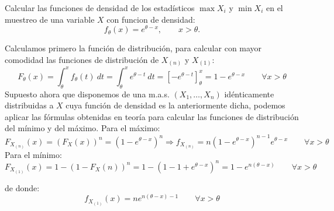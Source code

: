 \begin{ejercicio}
    Calcular las funciones de densidad de los estadísticos $\max X_i$ y $\min X_i$ en el muestreo de una variable $X$ con funcion de densidad:
    \begin{equation*}
        f_\theta(x) = e^{\theta-x}, \qquad x>\theta.
    \end{equation*}

    \noindent
    Calculamos primero la función de distribución, para calcular con mayor comodidad las funciones de distribución de $X_{(n)}$ y $X_{(1)}$:
    \begin{equation*}
        F_\theta(x) = \int_{\theta}^{x} f_\theta(t)~dt = \int_{\theta}^{x} e^{\theta-t}~dt  = \left[-e^{\theta-t}\right]_\theta^x = 1 - e^{\theta - x} \qquad \forall x>\theta
    \end{equation*}
    Supuesto ahora que disponemos de una m.a.s. $(X_1, \ldots, X_n)$ idénticamente distribuidas a $X$ cuya función de densidad es la anteriormente dicha, podemos aplicar las fórmulas obtenidas en teoría para calcular las funciones de distribución del mínimo y del máximo. Para el máximo:
    \begin{equation*}
        F_{X_{(n)}}(x) = {(F_X(x))}^{n} = {(1-e^{\theta-x})}^{n} \Longrightarrow f_{X_{(n)}} = n{(1-e^{\theta - x})}^{n-1}e^{\theta -x} \qquad \forall x>\theta
    \end{equation*}
    Para el mínimo:
    \begin{equation*}
        F_{X_{(1)}}(x) = 1 - {(1-F_X(n))}^{n} = 1-{(1-1+e^{\theta-x})}^{n} = 1-e^{n(\theta-x)} \qquad \forall x>\theta
    \end{equation*}

    de donde:
    \begin{equation*}
        f_{X_{(1)}}(x) = ne^{n(\theta-x)-1} \qquad \forall x>\theta
    \end{equation*}
\end{ejercicio}


